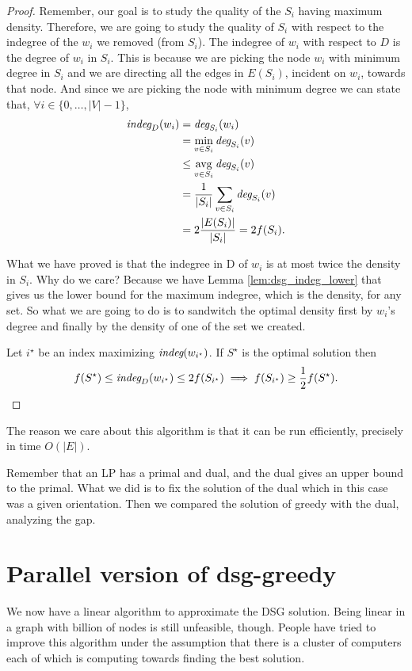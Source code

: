 \begin{proof}
Remember, our goal is to study the quality of the $S_i$ having maximum density. Therefore, we are going to study the quality of $S_i$ with respect to the indegree of the $w_i$ we removed (from $S_i$). The indegree of $w_i$ with respect to $D$ is the degree of $w_i$ in $S_i$. This is because we are picking the node $w_i$ with minimum degree in $S_i$ and we are directing all the edges in $E(S_i)$, incident on $w_i$, towards that node. And since we are picking the node with minimum degree we can state that, $\forall i \in \{0,\ldots, |V|-1\}$,
\begin{align}
\textit{indeg}_D(w_i) &= \textit{deg}_{S_i}(w_i)\\
&= \min_{v \in S_i}\textit{deg}_{S_i}(v) \\
&\leq \operatorname*{avg}_{v \in S_i}\textit{deg}_{S_i}(v) \\
&=\frac{1}{|S_i|}\sum_{v \in S_i}\textit{deg}_{S_i}(v)\\
&=2\frac{|E(S_i)|}{|S_i|} = 2f(S_i).
\end{align}

What we have proved is that the indegree in D of $w_i$ is at most twice the density in $S_i$. Why do we care? Because we have Lemma \ref{lem:dsg_indeg_lower} that gives us the lower bound for the maximum indegree, which is the density, for any set. So what we are going to do is to sandwitch the optimal density first by $w_i$'s degree and finally by the density of one of the set we created.

Let $i^\star$ be an index maximizing $\textit{indeg}(w_{i^\star})$. If $S^\star$ is the optimal solution then
\begin{equation}
	f(S^\star) \leq \textit{indeg}_D(w_{i^\star}) \leq 2f(S_{i^\star}) \implies f(S_{i^\star}) \geq \frac{1}{2}f(S^\star).
\end{equation}
\end{proof}	

The reason we care about this algorithm is that it can be run efficiently, precisely in time $O(|E|)$.


Remember that an LP has a primal and dual, and the dual gives an upper bound to the primal. What we did is to fix the solution of the dual which in this case was a given orientation. Then we compared the solution of greedy with the dual, analyzing the gap.

\section{Parallel version of dsg-greedy}

We now have a linear algorithm to approximate the DSG solution. Being linear in a graph with billion of nodes is still unfeasible, though. People have tried to improve this algorithm under the assumption that there is a cluster of computers each of which is computing towards finding the best solution.

